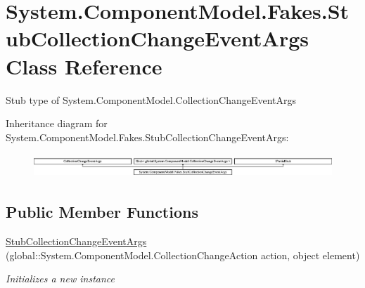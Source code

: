 \hypertarget{class_system_1_1_component_model_1_1_fakes_1_1_stub_collection_change_event_args}{\section{System.\-Component\-Model.\-Fakes.\-Stub\-Collection\-Change\-Event\-Args Class Reference}
\label{class_system_1_1_component_model_1_1_fakes_1_1_stub_collection_change_event_args}
}


Stub type of System.\-Component\-Model.\-Collection\-Change\-Event\-Args 


Inheritance diagram for System.\-Component\-Model.\-Fakes.\-Stub\-Collection\-Change\-Event\-Args\-:\begin{figure}[H]
\begin{center}
\leavevmode
\includegraphics[height=0.899598cm]{class_system_1_1_component_model_1_1_fakes_1_1_stub_collection_change_event_args}
\end{center}
\end{figure}
\subsection*{Public Member Functions}
\begin{DoxyCompactItemize}
\item 
\hyperlink{class_system_1_1_component_model_1_1_fakes_1_1_stub_collection_change_event_args_a7370d444b0eebf7719a34b0f4ea3fe15}{Stub\-Collection\-Change\-Event\-Args} (global\-::\-System.\-Component\-Model.\-Collection\-Change\-Action action, object element)
\begin{DoxyCompactList}\small\item\em Initializes a new instance\end{DoxyCompactList}\end{DoxyCompactItemize}
